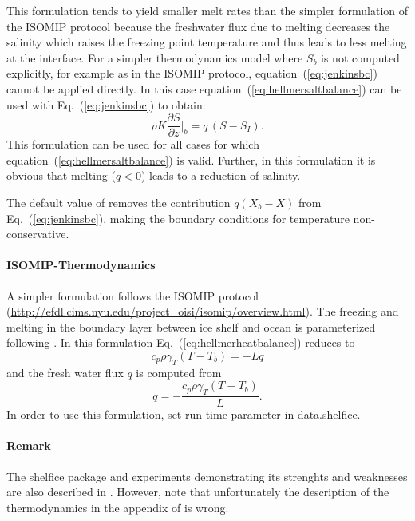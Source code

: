 This formulation tends to yield smaller melt rates than the simpler
formulation of the ISOMIP protocol because the freshwater flux due to
melting decreases the salinity which raises the freezing point
temperature and thus leads to less melting at the interface. For a
simpler thermodynamics model where $S_b$ is not computed explicitly,
for example as in the ISOMIP protocol, equation~(\ref{eq:jenkinsbc}) cannot
be applied directly. In this case equation~(\ref{eq:hellmersaltbalance})
can be used with Eq.~(\ref{eq:jenkinsbc}) to obtain:
\begin{equation}
 \rho{K}\frac{\partial{S}}{\partial{z}}\biggl|_{b}  = q\,(S-S_I).
\end{equation}
This formulation can be used for all cases for which
equation~(\ref{eq:hellmersaltbalance}) is valid. Further, in this
formulation it is obvious that melting ($q<0$) leads to a reduction of
salinity.

The default value of  removes the
contribution $q ( X_{b}-X )$ from Eq.~(\ref{eq:jenkinsbc}), making the
boundary conditions for temperature non-conservative.

\paragraph{ISOMIP-Thermodynamics}
\label{sec:pkg:shelfice:isomip}

A simpler formulation follows the ISOMIP protocol
(\url{http://efdl.cims.nyu.edu/project_oisi/isomip/overview.html}). The
freezing and melting in the boundary layer between ice shelf and ocean
is parameterized following \citet{grosfeld97}. In this formulation
Eq.~(\ref{eq:hellmerheatbalance}) reduces to 
\begin{equation}
  \label{eq:isomipheatbalance}
  c_{p} \rho \gamma_T (T - T_{b})  = -Lq 
\end{equation}
and the fresh water flux $q$ is computed from
\begin{equation}
  \label{eq:isomipfwflx}
  q = - \frac{c_{p} \rho \gamma_T (T - T_{b})}{L}.
\end{equation}
In order to use this formulation, set run-time parameter
 in data.shelfice.

\paragraph{Remark} The shelfice package and experiments demonstrating
its strenghts and weaknesses are also described in
\citet{losch08}. However, note that unfortunately the description of
the thermodynamics in the appendix of \citet{losch08} is wrong.


